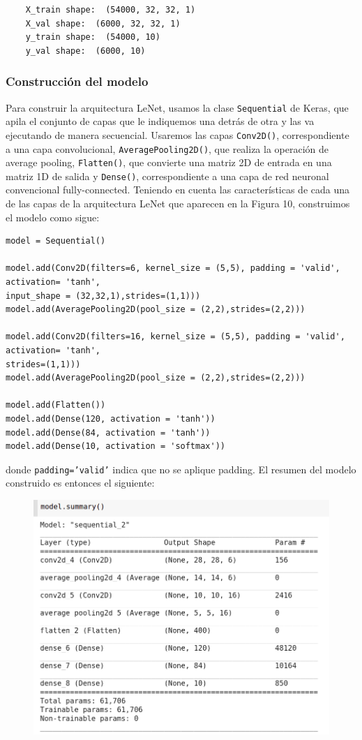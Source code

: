 \documentclass[a4paper,11pt]{article}
\begin{document}
\begin{verbatim}
	X_train shape:  (54000, 32, 32, 1)
	X_val shape:  (6000, 32, 32, 1)
	y_train shape:  (54000, 10)
	y_val shape:  (6000, 10)
\end{verbatim}

\subsubsection{Construcción del modelo}
Para construir la arquitectura LeNet, usamos la clase \texttt{Sequential} de Keras, que apila el conjunto de capas que le indiquemos una detrás de otra y las va ejecutando de manera secuencial. Usaremos las capas \texttt{Conv2D()}, correspondiente a una capa convolucional, \texttt{AveragePooling2D()}, que realiza la operación de average pooling, \texttt{Flatten()}, que convierte una matriz 2D de entrada en una matriz 1D de salida y \texttt{Dense()}, correspondiente a una capa de red neuronal convencional fully-connected. Teniendo en cuenta las características de cada una de las capas de la arquitectura LeNet que aparecen en la Figura 10, construimos el modelo como sigue:
\begin{verbatim}
model = Sequential()

model.add(Conv2D(filters=6, kernel_size = (5,5), padding = 'valid', activation= 'tanh', 
input_shape = (32,32,1),strides=(1,1)))
model.add(AveragePooling2D(pool_size = (2,2),strides=(2,2)))

model.add(Conv2D(filters=16, kernel_size = (5,5), padding = 'valid', activation= 'tanh',
strides=(1,1)))
model.add(AveragePooling2D(pool_size = (2,2),strides=(2,2)))

model.add(Flatten())
model.add(Dense(120, activation = 'tanh'))
model.add(Dense(84, activation = 'tanh'))
model.add(Dense(10, activation = 'softmax'))
\end{verbatim}
donde \texttt{padding='valid'} indica que no se aplique padding. El resumen del modelo construido es entonces el siguiente:
\begin{figure}[H]
	\centering
	\includegraphics[width=0.8\linewidth]{img/lenet3}
	\caption{}
	\label{fig:lenet3}
\end{figure}
\end{document}
